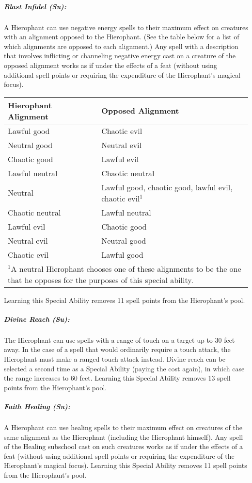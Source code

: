 \subparagraph{Blast Infidel (Su):}
A Hierophant can use negative energy spells to their maximum effect on creatures with an alignment opposed to the Hierophant. (See the table below for a list of which alignments are opposed to each alignment.) 
Any spell with a description that involves inflicting or channeling negative energy cast on a creature of the opposed alignment works as if under the effects of a  feat (without using additional spell points or requiring the expenditure of the Hierophant's magical focus).
\begin{center}
\begin{tabular}{|p{3cm}|p{3.4cm}|}
\hline
\textbf{Hierophant Alignment}&\textbf{Opposed Alignment}\\
\hline
Lawful good&		Chaotic evil\\
Neutral good&		Neutral evil\\
Chaotic good&		Lawful evil\\
Lawful neutral&		Chaotic neutral\\
Neutral&		Lawful good, chaotic good, lawful evil, chaotic evil$^1$\\
Chaotic neutral&	Lawful neutral\\
Lawful evil&		Chaotic good\\
Neutral evil&		Neutral good\\
Chaotic evil&		Lawful good\\
\hline
\multicolumn{2}{p{6.4cm}}{\scriptsize $^1$A neutral Hierophant chooses one of these alignments to be the one that he opposes for the purposes of this special ability.}
\end{tabular}
\end{center}
Learning this Special Ability removes 11 spell points from the Hierophant's pool.

\subparagraph{Divine Reach (Su):}
The Hierophant can use spells with a range of touch on a target up to 30 feet away. 
In the case of a spell that would ordinarily require a touch attack, the Hierophant must make a ranged touch attack instead.
Divine reach can be selected a second time as a Special Ability (paying the cost again), in which case the range increases to 60 feet. 
Learning this Special Ability removes 13 spell points from the Hierophant's pool.

\subparagraph{Faith Healing (Su):}
A Hierophant can use healing spells to their maximum effect on creatures of the same alignment as the Hierophant (including the Hierophant himself). 
Any spell of the Healing subschool cast on such creatures works as if under the effects of a  feat (without using additional spell points or requiring the expenditure of the Hierophant's magical focus).
Learning this Special Ability removes 11 spell points from the Hierophant's pool.

